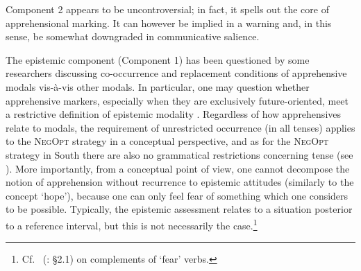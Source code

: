 \documentclass[output=paper,colorlinks,citecolor=brown]{langscibook}
\begin{document}
Component 2 appears to be uncontroversial; in fact, it spells out the core of apprehensional marking. It can however be implied in a warning and, in this sense, be somewhat downgraded in communicative salience. 

\largerpage
The epistemic component (Component 1) has been questioned by some researchers discussing co-occurrence and replacement conditions of apprehensive modals vis-à-vis other modals. In particular, one may question whether apprehensive markers, especially when they are exclusively future-oriented, meet a restrictive definition of epistemic modality \citep{chapters/vuillermet, chapters/introduction}. Regardless of how apprehensives relate to modals, the requirement of unrestricted occurrence (in all tenses) applies to the \textsc{NegOpt} strategy in a conceptual perspective, and as for the \textsc{NegOpt} strategy in South  there are also no grammatical restrictions concerning tense (see ). More importantly, from a conceptual point of view, one cannot decompose the notion of apprehension without recurrence to epistemic attitudes (similarly to the concept `hope'), because one can only feel fear of something which one considers to be possible. Typically, the epistemic assessment relates to a situation posterior to a reference interval, but this is not necessarily the case.\footnote{Cf.\ \citeauthor{dobrushina2021}  (\citeyear{dobrushina2021}: \S2.1) on complements of `fear' verbs.}
\end{document}
